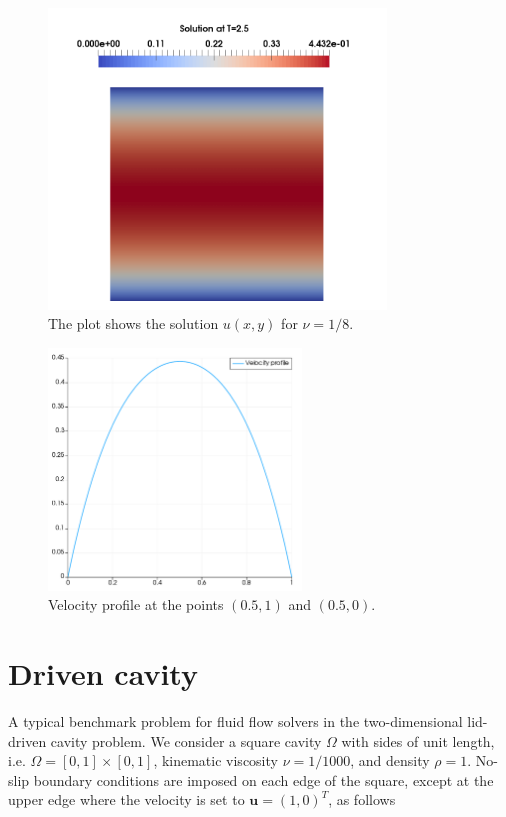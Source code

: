 \documentclass[11pt,a4paper,titlepage]{report}
\begin{document}
\begin{figure}[h!]
\centering
\includegraphics[width=0.8\textwidth]{images/velocity_solution.png}
\caption{The plot shows the solution $u(x,y)$ for $\nu = 1/8$.}
\end{figure}

\begin{figure}[h!]
\centering
\includegraphics[width=0.6\textwidth]{images/velocity_profile.pdf}
\caption{Velocity profile at the points $(0.5, 1)$ and $(0.5, 0)$.}
\end{figure}

\section{Driven cavity}

A typical benchmark problem for fluid flow solvers in the two-dimensional lid-driven cavity problem. We consider a square cavity $\Omega$ with sides of unit length, i.e. $\Omega = [0,1] \times [0,1]$, kinematic viscosity $\nu = 1/1000$, and density $\rho = 1$. No-slip boundary conditions are imposed on each edge of the square, except at the upper edge where the velocity is set to $\mathbf{u} = (1,0)^T$, as follows
\end{document}
